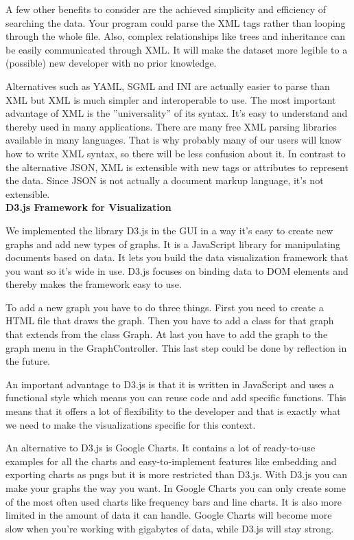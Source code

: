 \documentclass[a4paper,english,fleqn]{exam}
\begin{document}
A few other benefits to consider are the achieved simplicity and efficiency of searching the data. Your program could parse the XML tags rather than looping through the whole file. Also, complex relationships like trees and inheritance can be easily communicated through XML. It will make the dataset more legible to a (possible) new developer with no prior knowledge.
 
Alternatives such as YAML, SGML and INI are actually easier to parse than XML but XML is much simpler and interoperable to use. The most important advantage of XML is the ”universality” of its syntax. It's easy to understand and thereby used in many applications. There are many free XML parsing libraries available in many languages. That is why probably many of our users will know how to write XML syntax, so there will be less confusion about it. In contrast to the alternative JSON, XML is extensible with new tags or attributes to represent the data. Since JSON is not actually a document markup language, it's not extensible.
\\

\textbf{D3.js Framework for Visualization} 

We implemented the library D3.js in the GUI in a way it's easy to create new graphs and add new types of graphs. It is a JavaScript library for manipulating documents based on data. It lets you build the data visualization framework that you want so it's wide in use. D3.js focuses on binding data to DOM elements and thereby makes the framework easy to use.

To add a new graph you have to do three things. First you need to create a HTML file that draws the graph. Then you have to add a class for that graph that extends from the class Graph. At last you have to add the graph to the graph menu in the GraphController. This last step could be done by reflection in the future.

An important advantage to D3.js is that it is written in JavaScript and uses a functional style which means you can reuse code and add specific functions. This means that it offers a lot of flexibility to the developer and that is exactly what we need to make the visualizations specific for this context.
 
 \newpage 
 
An alternative to D3.js is Google Charts. It contains a lot of ready-to-use examples for all the charts and easy-to-implement features like embedding and exporting charts as pngs but it is more restricted than D3.js. With D3.js you can make your graphs the way you want. In Google Charts you can only create some of the most often used charts like frequency bars and line charts. It is also more limited in the amount of data it can handle. Google Charts will become more slow when you're working with gigabytes of data, while D3.js will stay strong.
 
\end{document}
